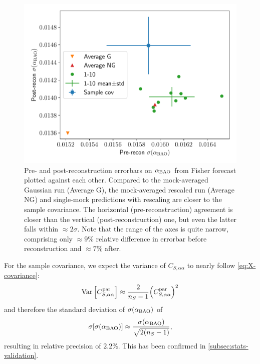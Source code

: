 \begin{figure}
\centering
\includegraphics[width=\columnwidth]{img/DESI-M2/sigma_alpha-pre-post.pdf}
\caption[Errorbars on the BAO isotropic scale parameter obtained from different covariances for the \desimtwo{} mocks]{Pre- and post-reconstruction errorbars on $\alpha_{\rm BAO}$ from Fisher forecast plotted against each other.
Compared to the mock-averaged Gaussian run (Average G), the mock-averaged rescaled run (Average NG) and single-mock predictions with rescaling are closer to the sample covariance.
The horizontal (pre-reconstruction) agreement is closer than the vertical (post-reconstruction) one, but even the latter falls within $\approx 2\sigma$.
Note that the range of the axes is quite narrow, comprising only $\approx 9\%$ relative difference in errorbar before reconstruction and $\approx 7\%$ after.}
\label{fig:sigma_alpha-pre-post}
\end{figure}

For the sample covariance, we expect the variance of $C_{S,\alpha\alpha}$ to nearly follow \cref{eq:X-covariance}:
\begin{equation}
\operatorname{Var} {\left[ C^{\rm par}_{S,\alpha\alpha} \right]} \approx \frac2{n_S-1} {\left( C^{\rm par}_{S,\alpha\alpha} \right)}^2
\end{equation}
and therefore the standard deviation of $\sigma(\alpha_{\rm BAO})$ of
\begin{equation} \label{eq:sigma-sigma-alpha}
\sigma{\left[ \sigma(\alpha_{\rm BAO}) \right]} \approx \frac{\sigma(\alpha_{\rm BAO})}{\sqrt{2(n_S-1)}},
\end{equation}
resulting in relative precision of $2.2\%$.
This has been confirmed in \cref{subsec:stats-validation}.

